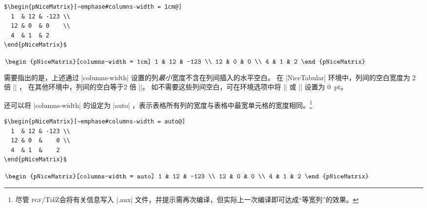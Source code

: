 \documentclass[dvipsnames]{article}%
\def\tikzname{Ti\emph{k}Z}
\begin{document}
\medskip
\begin{BVerbatim}[baseline=c,boxwidth=10cm]
$\begin{pNiceMatrix}[~emphase#columns-width = 1cm@]
  1  & 12 & -123 \\
  12 & 0  & 0    \\
  4  & 1  & 2 
\end{pNiceMatrix}$
\end{BVerbatim}
$\begin{pNiceMatrix}[columns-width = 1cm]
1  & 12 & -123 \\
12 & 0  & 0    \\
4  & 1  & 2 
\end{pNiceMatrix}$

\medskip
需要指出的是，上述通过 |columns-width| 设置的列\emph{最小}宽度不含在列间插入的水平空白。
在 |{NiceTabular}| 环境中，列间的空白宽度为 2 倍 |\tabcolsep| ，
在其他环境中，列间的空白等于2 倍 |\arraycolsep|。
如不需要这些列间空白，可在环境选项中将 |\tabcolsep| 或 |\arraycolsep| 设置为 $0$~pt。

\bigskip
还可以将 |columns-width| 的设定为 |auto| ，表示表格所有列的宽度与表格中最宽单元格的宽度相同。\footnote{尽管 \textsc{pgf}/\tikzname 会将有关信息写入 |.aux| 文件，并提示需再次编译，但实际上一次编译即可达成“等宽列”的效果。}


\medskip
\begin{BVerbatim}[baseline=c,boxwidth=10cm]
$\begin{pNiceMatrix}[~emphase#columns-width = auto@]
  1  & 12 & -123 \\
  12 & 0  &    0 \\
  4  & 1  &    2
\end{pNiceMatrix}$
\end{BVerbatim}
$\begin{pNiceMatrix}[columns-width = auto]
1  & 12 & -123 \\
12 & 0  & 0    \\
4  & 1  & 2 
\end{pNiceMatrix}$
\end{document}
